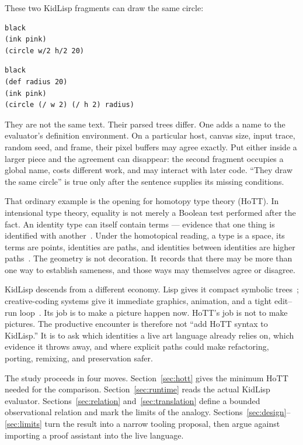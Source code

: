 \documentclass[10pt,letterpaper,twocolumn]{article}
\begin{document}
These two KidLisp fragments can draw the same circle:

\begin{lstlisting}
black
(ink pink)
(circle w/2 h/2 20)
\end{lstlisting}

\begin{lstlisting}
black
(def radius 20)
(ink pink)
(circle (/ w 2) (/ h 2) radius)
\end{lstlisting}

They are not the same text. Their parsed trees differ. One adds a name to the evaluator's definition environment. On a particular host, canvas size, input trace, random seed, and frame, their pixel buffers may agree exactly. Put either inside a larger piece and the agreement can disappear: the second fragment occupies a global name, costs different work, and may interact with later code. ``They draw the same circle'' is true only after the sentence supplies its missing conditions.

That ordinary example is the opening for homotopy type theory (HoTT). In intensional type theory, equality is not merely a Boolean test performed after the fact. An identity type can itself contain terms --- evidence that one thing is identified with another~\citep{martinlof1984,hottbook2013}. Under the homotopical reading, a type is a space, its terms are points, identities are paths, and identities between identities are higher paths~\citep{awodey2009,hottbook2013}. The geometry is not decoration. It records that there may be more than one way to establish sameness, and those ways may themselves agree or disagree.

KidLisp descends from a different economy. Lisp gives it compact symbolic trees~\citep{mccarthy1960recursive}; creative-coding systems give it immediate graphics, animation, and a tight edit--run loop~\citep{mccarthy2015p5,jack2026hydra,scudder2026kidlisp}. Its job is to make a picture happen now. HoTT's job is not to make pictures. The productive encounter is therefore not ``add HoTT syntax to KidLisp.'' It is to ask which identities a live art language already relies on, which evidence it throws away, and where explicit paths could make refactoring, porting, remixing, and preservation safer.

The study proceeds in four moves. Section~\ref{sec:hott} gives the minimum HoTT needed for the comparison. Section~\ref{sec:runtime} reads the actual KidLisp evaluator. Sections~\ref{sec:relation} and~\ref{sec:translation} define a bounded observational relation and mark the limits of the analogy. Sections~\ref{sec:design}--\ref{sec:limits} turn the result into a narrow tooling proposal, then argue against importing a proof assistant into the live language.
\end{document}
